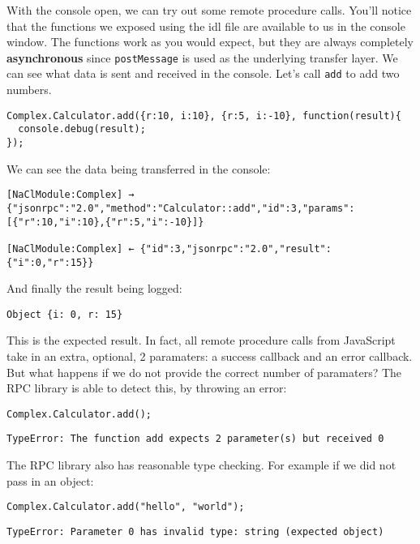  With the console open, we can try out some remote procedure calls.
You'll notice that the functions we exposed using the idl file are
available to us in the console window. The functions work as you would
expect, but they are always completely \textbf{asynchronous} since
\texttt{postMessage} is used as the underlying transfer layer. We can
see what data is sent and received in the console. Let's call
\texttt{add} to add two numbers.

\begin{verbatim}
Complex.Calculator.add({r:10, i:10}, {r:5, i:-10}, function(result){
  console.debug(result);
});
\end{verbatim}

We can see the data being transferred in the console:

\begin{verbatim}
[NaClModule:Complex] → {"jsonrpc":"2.0","method":"Calculator::add","id":3,"params":[{"r":10,"i":10},{"r":5,"i":-10}]}

[NaClModule:Complex] ← {"id":3,"jsonrpc":"2.0","result":{"i":0,"r":15}}
\end{verbatim}

And finally the result being logged:

\begin{verbatim}
Object {i: 0, r: 15}
\end{verbatim}

This is the expected result. In fact, all remote procedure calls from
JavaScript take in an extra, optional, 2 paramaters: a success callback
and an error callback. But what happens if we do not provide the correct
number of paramaters? The RPC library is able to detect this, by
throwing an error:

\begin{verbatim}
Complex.Calculator.add();
\end{verbatim}

\begin{verbatim}
TypeError: The function add expects 2 parameter(s) but received 0
\end{verbatim}

The RPC library also has reasonable type checking. For example if we did
not pass in an object:

\begin{verbatim}
Complex.Calculator.add("hello", "world");
\end{verbatim}

\begin{verbatim}
TypeError: Parameter 0 has invalid type: string (expected object)
\end{verbatim}

